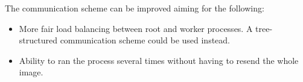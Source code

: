\documentclass[11pt,a4paper,oneside]{article}
\begin{document}
The communication scheme can be improved aiming for the following:
\begin{itemize}
    \item More fair load balancing between root and worker processes. A
        tree-structured communication scheme could be used instead.
    \item Ability to ran the process several times without having to
        resend the whole image.
\end{itemize}

\end{document}
